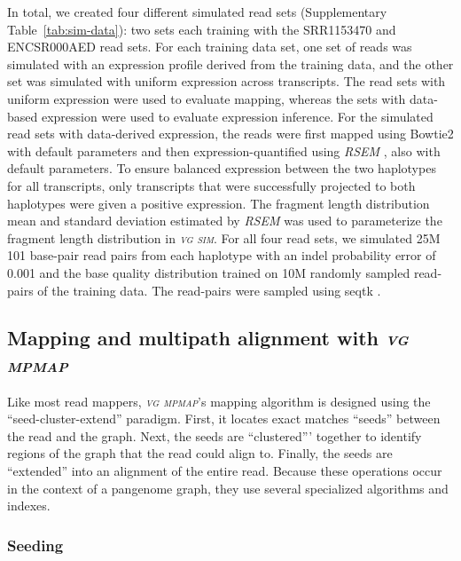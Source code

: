 \documentclass[11pt]{ucthesis}
\newcommand{\tool}[1]{\emph{\textsc{#1}}}
\begin{document}
In total, we created four different simulated read sets (Supplementary Table~\ref{tab:sim-data}): two sets each training with the SRR1153470 and ENCSR000AED read sets. For each training data set, one set of reads was simulated with an expression profile derived from the training data, and the other set was simulated with uniform expression across transcripts. The read sets with uniform expression were used to evaluate mapping, whereas the sets with data-based expression were used to evaluate expression inference. For the simulated read sets with data-derived expression, the reads were first mapped using Bowtie2 \cite{langmead2012fast} with default parameters and then expression-quantified using \tool{RSEM} \cite{li2011rsem}, also with default parameters. To ensure balanced expression between the two haplotypes for all transcripts, only transcripts that were successfully projected to both haplotypes were given a positive expression. The fragment length distribution mean and standard deviation estimated by \tool{RSEM} was used to parameterize the fragment length distribution in \tool{vg sim}. For all four read sets, we simulated 25M 101 base-pair read pairs from each haplotype with an indel probability error of 0.001 and the base quality distribution trained on 10M randomly sampled read-pairs of the training data. The read-pairs were sampled using seqtk \cite{seqtk}. 


\subsection{Mapping and multipath alignment with \tool{vg mpmap}}

Like most read mappers, \tool{vg mpmap}'s mapping algorithm is designed using the ``seed-cluster-extend'' paradigm. First, it locates exact matches ``seeds'' between the read and the graph. Next, the seeds are ``clustered''' together to identify regions of the graph that the read could align to. Finally, the seeds are ``extended'' into an alignment of the entire read. Because these operations occur in the context of a pangenome graph, they use several specialized algorithms and indexes.

\subsubsection{Seeding}
\end{document}
